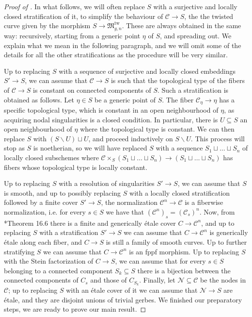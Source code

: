 \documentclass{amsart}
\newcommand{\sC}{\mathscr{C}}
\newcommand{\sN}{\mathscr{N}}
\newcommand{\cC}{\mathcal{C}}
\theoremstyle{definition}
\theoremstyle{definition}
\begin{document}
{\begin{proof}[Proof of ]
         
         In what follows, we will often replace $S$ with a surjective and locally closed stratification of it, to simplify the behaviour of $\sC\to S$, the the twisted curve given by the morphism $S\to \mathfrak{M}_{g,n}^{\operatorname{tw}}$. These are always obtained in the same way: recursively, starting from a generic point $\eta$ of $S$, and spreading out. We explain what we mean in the following paragraph, and we will omit some of the details for all the other stratifications as the procedure will be very similar.
         
         Up to replacing $S$ with a sequence of surjective and locally closed embeddings $S'\to S$, we can assume that $\sC\to S$ is such that the topological type of the fibers of $\sC\to S$ is constant on connected components of $S$. Such a stratification is obtained as follows. Let $\eta\in S$ be a generic point of $S$.
         The fiber $\sC_\eta\to \eta$ has a specific topological type, which is constant in an open neighbourhood of $\eta$, as acquiring nodal singularities is a closed condition. In particular, there is $U\subseteq S$ an open neighbourhood of $\eta$ where the topological type is constant. We can then replace $S$ with $(S\smallsetminus U) \sqcup U$, and proceed inductively on $S\smallsetminus U$. This process will stop as $S$ is noetherian, so we will have replaced $S$
         with a sequence $S_1\sqcup\ldots\sqcup S_n$ of locally closed subschemes where $\cC\times_S (S_1\sqcup\ldots\sqcup S_n)\to (S_1\sqcup\ldots\sqcup S_n)$ has fibers whose topological type is locally constant.
         
         Up to replacing $S$ with a resolution of singularities $S'\to S$, we can assume that $S$ is smooth, and up to possibly replacing $S$ with a locally closed stratification followed by a finite cover $S'\to S$, the normalization $\sC^n\to\sC$ is a fiberwise normalization, i.e. for every $s\in S$ we have that $(\sC^n)_s= (\sC_s)^n$. Now, from \cite{LMB}*{Theorem 16.6} there is a finite and generically
         \'etale cover $C\to \sC^n$, and up to replacing $S$ with a stratification $S'\to S$ we can assume that $C\to \sC^n$ is generically
         \'etale along each fiber, and $C\to S$ is still a family of smooth curves. Up to further stratifying $S$ we can assume that $C\to \sC^n$ is an fppf morphism. Up to replacing $S$ with the Stein factorization of $C\to S$, we can assume that for every $s\in S$ belonging to a connected component $S_k\subseteq S$ there is a bijection between the connected components of $C_s$ and those of $C_{S_k}$. Finally, let $\sN\subseteq \sC$ be the nodes in $\sC$; up to replacing $S$ with an \'etale cover of it we can assume that $\sN\to S$ are \'etale, and they are disjoint unions of trivial gerbes. We finished our preparatory steps, we are ready to prove our main result.


\end{proof}}
\end{document}
